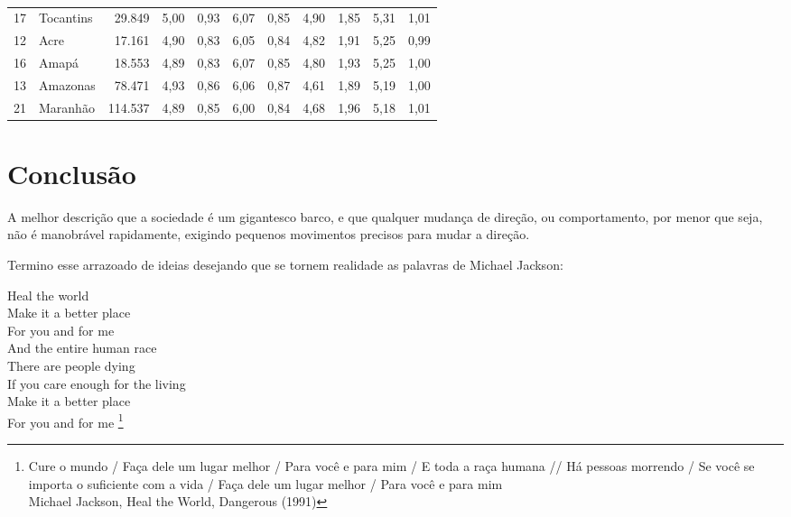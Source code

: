 \begin{table}[]
\begin{tabular}{llrrrrrrrrr}
        17 & Tocantins           & 29.849  & 5,00 & 0,93 & 6,07 & 0,85 & 4,90 & 1,85 & 5,31 & 1,01 \\
        \rowcolor[HTML]{DCE6F1}
        12 & Acre                & 17.161  & 4,90 & 0,83 & 6,05 & 0,84 & 4,82 & 1,91 & 5,25 & 0,99 \\
        16 & Amapá               & 18.553  & 4,89 & 0,83 & 6,07 & 0,85 & 4,80 & 1,93 & 5,25 & 1,00 \\
        \rowcolor[HTML]{DCE6F1}
        13 & Amazonas            & 78.471  & 4,93 & 0,86 & 6,06 & 0,87 & 4,61 & 1,89 & 5,19 & 1,00 \\
        21 & Maranhão            & 114.537 & 4,89 & 0,85 & 6,00 & 0,84 & 4,68 & 1,96 & 5,18 & 1,01
    \end{tabular}
    \caption{}
    \label{table:IDH}
\end{table}



\section{Conclusão}

A melhor descrição que a sociedade é um gigantesco barco, e que qualquer mudança de direção, ou comportamento, por menor que seja, não é manobrável rapidamente, exigindo pequenos movimentos precisos para mudar a direção.


Termino esse arrazoado de ideias desejando que se tornem realidade as palavras de Michael Jackson:

\begin{citacao}
    Heal the world\\
    Make it a better place\\
    For you and for me\\
    And the entire human race\\

    There are people dying\\
    If you care enough for the living\\
    Make it a better place\\
    For you and for me \footnote{
        Cure o mundo / Faça dele um lugar melhor / Para você e para mim / E toda a raça humana //
        Há pessoas morrendo / Se você se importa o suficiente com a vida / Faça dele um lugar melhor / Para você e para mim \\
        Michael Jackson, Heal the World, Dangerous (1991)
    }
\end{citacao}
